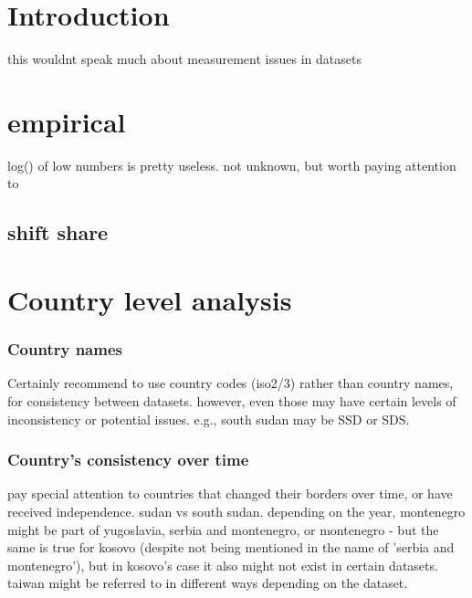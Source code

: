 \section{Introduction}

this wouldnt speak much about measurement issues in datasets

\section{empirical}
log() of low numbers is pretty useless. not unknown, but worth paying attention to

\subsection{shift share}

\section{Country level analysis}

\subsubsection{Country names}
Certainly recommend to use country codes (iso2/3) rather than country names, for consistency between datasets. however, even those may have certain levels of inconsistency or potential issues. e.g., south sudan may be SSD or SDS. 

\subsubsection{Country's consistency over time}

pay special attention to countries that changed their borders over time, or have received independence. sudan vs south sudan. depending on the year, montenegro might be part of yugoslavia, serbia and montenegro, or montenegro - but the same is true for kosovo (despite not being mentioned in the name of 'serbia and montenegro'), but in kosovo's case it also might not exist in certain datasets. taiwan might be referred to in different ways depending on the dataset.

